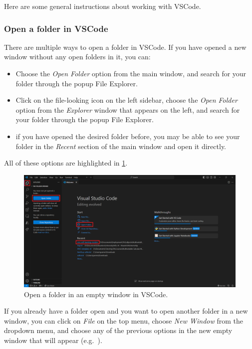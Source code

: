 \documentclass[a4paper,10pt]{article}
\begin{document}
Here are some general instructions about working with VSCode.

\subsubsection{Open a folder in VSCode}

There are multiple ways to open a folder in VSCode. If you have opened a new window without any open folders in it, you can:
\begin{itemize}
    \item Choose the \emph{Open Folder} option from the main window, and search for your folder through the popup File Explorer.
    \item Click on the file-looking icon on the left sidebar, choose the \emph{Open Folder} option from the \emph{Explorer} window that appears on the left, and search for your folder through the popup File Explorer.
    \item if you have opened the desired folder before, you may be able to see your folder in the \emph{Recent} section of the main window and open it directly.
\end{itemize}
All of these options are highlighted in \cref{fig:vscode_open_folder_1}.

\begin{figure}[htbp]
    \centering
    \includegraphics[width=\textwidth]{vscode_open_folder_1.png}
    \caption{Open a folder in an empty window in VSCode.}
    \label{fig:vscode_open_folder_1}   
\end{figure}

If you already have a folder open and you want to open another folder in a new window, you can click on \emph{File} on the top menu, choose \emph{New Window} from the dropdown menu, and choose any of the previous options in the new empty window that will appear (e.g.\ ).
\end{document}
